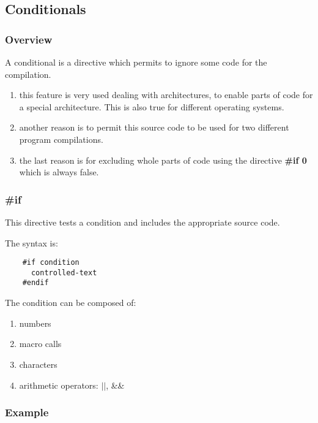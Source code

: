 {%
%

\subsection{Conditionals}


\begin{frame}
  \frametitle{Overview}

  A conditional is a directive which permits to ignore some code for the
  compilation.

  \begin{enumerate}
    \item
      this feature is very used dealing with architectures, to enable
      parts of code for a special architecture. This is also true for
      different operating systems.
    \item
      another reason is to permit this source code to be used for
      two different program compilations.
    \item
      the last reason is for excluding whole parts of code using the
      directive \textbf{\#if 0} which is always false.
  \end{enumerate}
\end{frame}


\begin{frame}[containsverbatim]
  \frametitle{\textbf{\#if}}

  This directive tests a condition and includes the appropriate source code.

  \nl

  The syntax is:

  \begin{verbatim}
    #if condition
      controlled-text
    #endif
  \end{verbatim}

  The condition can be composed of:

  \begin{enumerate}
    \item
      numbers
    \item
      macro calls
    \item
      characters
    \item
      arithmetic operators: $||$, \&\&
  \end{enumerate}
\end{frame}


\begin{frame}[containsverbatim]
  \frametitle{Example}


\end{frame}}
